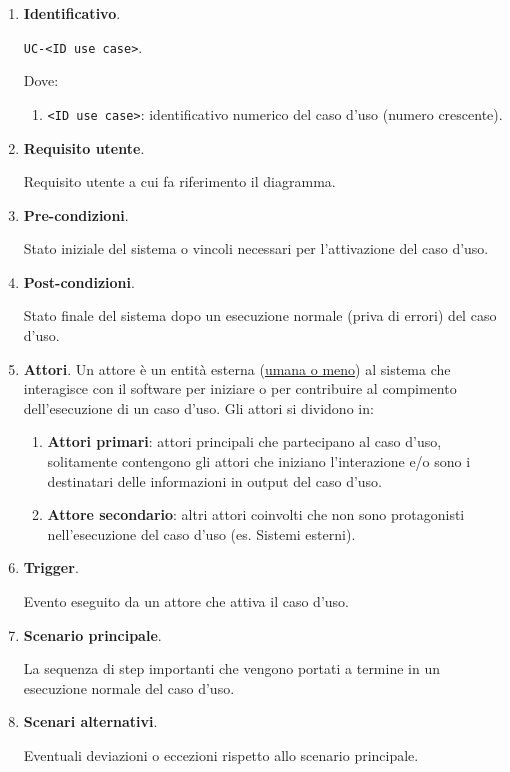 \begin{enumerate}
    \item \textbf{Identificativo}.
    
    \texttt{UC-<ID use case>}. 
    
    Dove:
    \begin{enumerate}
        \item \texttt{<ID use case>}: identificativo numerico del caso d'uso (numero crescente).
    \end{enumerate}

    \item \textbf{Requisito utente}.
    
    Requisito utente a cui fa riferimento il diagramma.

    \item \textbf{Pre-condizioni}.
    
    Stato iniziale del sistema o vincoli necessari per l'attivazione del caso d'uso.

    \item \textbf{Post-condizioni}.
    
    Stato finale del sistema dopo un esecuzione normale (priva di errori) del caso d'uso.

    \item \textbf{Attori}.
    Un attore è un entità esterna (\underline{umana o meno}) al sistema che interagisce con il software per iniziare o per contribuire al compimento dell'esecuzione di un caso d'uso.  
    Gli attori si dividono in:
    \begin{enumerate}
        \item  \textbf{Attori primari}: attori principali che partecipano al caso d'uso, solitamente contengono gli attori che iniziano l'interazione e/o sono i destinatari delle informazioni in output del caso d'uso.
        \item \textbf{Attore secondario}: altri attori coinvolti che non sono protagonisti nell'esecuzione del caso d'uso (es. Sistemi esterni).
    \end{enumerate}

    \item \textbf{Trigger}.
    
    Evento eseguito da un attore che attiva il caso d'uso.

    \item \textbf{Scenario principale}.
    
    La sequenza di step importanti che vengono portati a termine in un esecuzione normale del caso d'uso.
    
    \item \textbf{Scenari alternativi}.

    Eventuali deviazioni o eccezioni rispetto allo scenario principale.
\end{enumerate}

